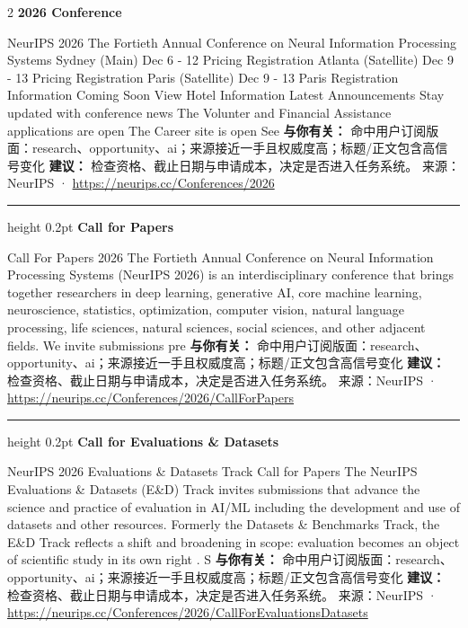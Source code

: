 \documentclass[10.5pt]{ctexart}
\begin{document}
\begin{multicols}{2}
{\large\bfseries 2026 Conference}\par
NeurIPS 2026 The Fortieth Annual Conference on Neural Information Processing Systems Sydney (Main) Dec 6 - 12 Pricing Registration Atlanta (Satellite) Dec 9 - 13 Pricing Registration Paris (Satellite) Dec 9 - 13 Paris Registration Information Coming Soon View Hotel Information Latest Announcements Stay updated with conference news The Volunter and Financial Assistance applications are open The Career site is open See
\textbf{与你有关：} 命中用户订阅版面：research、opportunity、ai；来源接近一手且权威度高；标题/正文包含高信号变化
\textbf{建议：} 检查资格、截止日期与申请成本，决定是否进入任务系统。
{\footnotesize\color{ormuted} 来源：NeurIPS · \url{https://neurips.cc/Conferences/2026}}
\vspace{2mm}
\hrule height 0.2pt
\vspace{2mm}
{\large\bfseries Call for Papers}\par
Call For Papers 2026 The Fortieth Annual Conference on Neural Information Processing Systems (NeurIPS 2026) is an interdisciplinary conference that brings together researchers in deep learning, generative AI, core machine learning, neuroscience, statistics, optimization, computer vision, natural language processing, life sciences, natural sciences, social sciences, and other adjacent fields. We invite submissions pre
\textbf{与你有关：} 命中用户订阅版面：research、opportunity、ai；来源接近一手且权威度高；标题/正文包含高信号变化
\textbf{建议：} 检查资格、截止日期与申请成本，决定是否进入任务系统。
{\footnotesize\color{ormuted} 来源：NeurIPS · \url{https://neurips.cc/Conferences/2026/CallForPapers}}
\vspace{2mm}
\hrule height 0.2pt
\vspace{2mm}
{\large\bfseries Call for Evaluations \& Datasets}\par
NeurIPS 2026 Evaluations \& Datasets Track Call for Papers The NeurIPS Evaluations \& Datasets (E\&D) Track invites submissions that advance the science and practice of evaluation in AI/ML including the development and use of datasets and other resources. Formerly the Datasets \& Benchmarks Track, the E\&D Track reflects a shift and broadening in scope: evaluation becomes an object of scientific study in its own right . S
\textbf{与你有关：} 命中用户订阅版面：research、opportunity、ai；来源接近一手且权威度高；标题/正文包含高信号变化
\textbf{建议：} 检查资格、截止日期与申请成本，决定是否进入任务系统。
{\footnotesize\color{ormuted} 来源：NeurIPS · \url{https://neurips.cc/Conferences/2026/CallForEvaluationsDatasets}}

\end{multicols}
\end{document}
